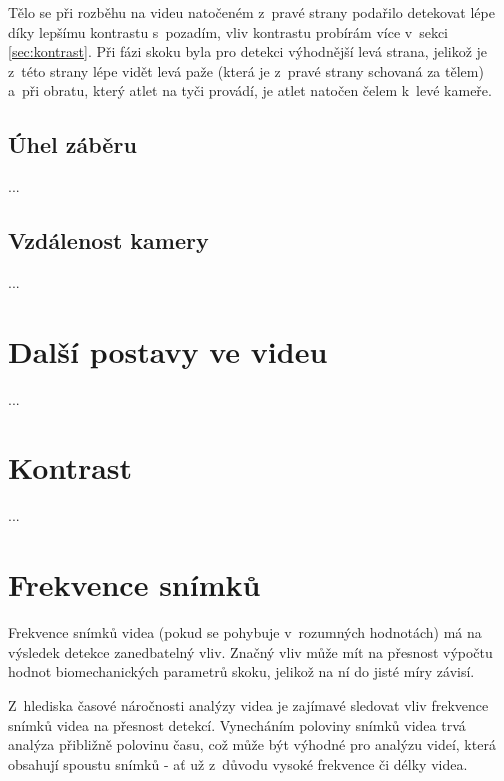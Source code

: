 Tělo se při rozběhu na videu natočeném z~pravé strany podařilo detekovat lépe díky lepšímu kontrastu s~pozadím, vliv kontrastu probírám více v~sekci \ref{sec:kontrast}. Při fázi skoku byla pro detekci výhodnější levá strana, jelikož je z~této strany lépe vidět levá paže (která je z~pravé strany schovaná za tělem) a~při obratu, který atlet na tyči provádí, je atlet natočen čelem k~levé kameře.



\subsection{Úhel záběru}

...



\subsection{Vzdálenost kamery}

...




\section{Další postavy ve videu}
\label{sec:postavy}

...




\section{Kontrast}

...




\section{Frekvence snímků}

Frekvence snímků videa (pokud se pohybuje v~rozumných hodnotách) má na výsledek detekce zanedbatelný vliv. Značný vliv může mít na přesnost výpočtu hodnot biomechanických parametrů skoku, jelikož na ní do jisté míry závisí.

Z~hlediska časové náročnosti analýzy videa je zajímavé sledovat vliv frekvence snímků videa na přesnost detekcí. Vynecháním poloviny snímků videa trvá analýza přibližně polovinu času, což může být výhodné pro analýzu videí, která obsahují spoustu snímků - ať už z~důvodu vysoké frekvence či délky videa.

